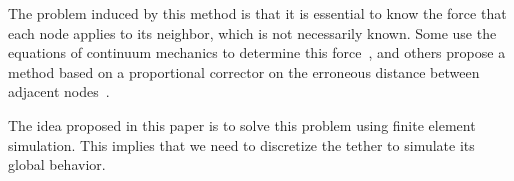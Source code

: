 The problem induced by this method is that it is essential to know the force that each node applies to its neighbor, which is not necessarily known. Some use the equations of continuum mechanics to determine this force~\cite{koenemann_modeling_2017, prabhakar_dynamics_2005}, and others propose a method based on a proportional corrector on the erroneous distance between adjacent nodes~\cite{ganoni_unreal,blintsov_development_2017}.

The idea proposed in this paper is to solve this problem using finite element simulation. This implies that we need to discretize the tether to simulate its global behavior.